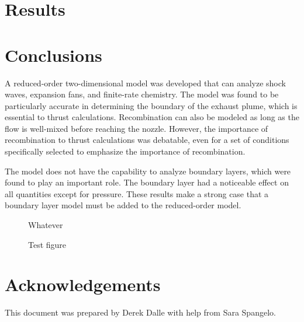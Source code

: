\documentclass[conference]{../aiaa-pretty}
\begin{document}
\section{Results}

\section{Conclusions}                            \label{sec:conclusion}
A reduced-order two-dimensional model was developed that can analyze shock waves, expansion fans, and finite-rate chemistry.  The model was found to be particularly accurate in determining the boundary of the exhaust plume, which is essential to thrust calculations.  Recombination can also be modeled as long as the flow is well-mixed before reaching the nozzle.  However, the importance of recombination to thrust calculations was debatable, even for a set of conditions specifically selected to emphasize the importance of recombination.

The model does not have the capability to analyze boundary layers, which were found to play an important role.  The boundary layer had a noticeable effect on all quantities except for pressure.  These results make a strong case that a boundary layer model must be added to the reduced-order model.

\begin{figure}[!h]
 \begin{center}
  Whatever
 \end{center}
 \caption{Test figure}
\end{figure}

\section*{Acknowledgements}
This document was prepared by Derek Dalle with help from Sara Spangelo.



\end{document}

